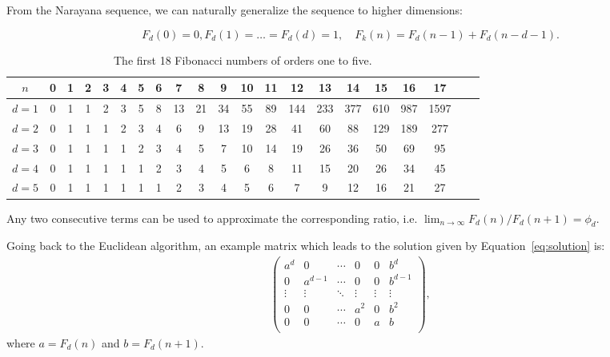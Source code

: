 \documentclass[english,version-2020-11]{uzl-thesis}
\begin{document}
From the Narayana sequence, we can naturally generalize the sequence to higher dimensions:

\[
  F_d(0) = 0, F_d(1) = \dots = F_d(d) = 1, \quad F_k(n) = F_d(n - 1) + F_d(n - d - 1).
\]

\begin{table}[t]
  \caption{The first 18 Fibonacci numbers of orders one to five.}
  \begin{tabular}{c|cccccccccccccccccccc}
    $n$     & 0 & 1 & 2 & 3 & 4 & 5 & 6 & 7  & 8  & 9  & 10 & 11 & 12  & 13  & 14  & 15  & 16  & 17   \\ %
    \hline
    $d = 1$ & 0 & 1 & 1 & 2 & 3 & 5 & 8 & 13 & 21 & 34 & 55 & 89 & 144 & 233 & 377 & 610 & 987 & 1597 \\ %
    $d = 2$ & 0 & 1 & 1 & 1 & 2 & 3 & 4 & 6  & 9  & 13 & 19 & 28 & 41  & 60  & 88  & 129 & 189 & 277  \\ %
    $d = 3$ & 0 & 1 & 1 & 1 & 1 & 2 & 3 & 4  & 5  & 7  & 10 & 14 & 19  & 26  & 36  & 50  & 69  & 95   \\ %
    $d = 4$ & 0 & 1 & 1 & 1 & 1 & 1 & 2 & 3  & 4  & 5  & 6  & 8  & 11  & 15  & 20  & 26  & 34  & 45   \\ %
    $d = 5$ & 0 & 1 & 1 & 1 & 1 & 1 & 1 & 2  & 3  & 4  & 5  & 6  & 7   & 9   & 12  & 16  & 21  & 27   \\ %
  \end{tabular}
\end{table}

Any two consecutive terms can be used to approximate the corresponding ratio, i.e. $\lim_{n \to \infty} F_d(n) / F_d(n + 1) = \phi_d$.

Going back to the Euclidean algorithm,
an example matrix which leads to the solution given by Equation~\ref{eq:solution} is:
\begin{align*}
  \left(\begin{array}{ccccc|c}
    a^d    & 0       & \cdots & 0      & 0      & b^d     \\
    0      & a^{d-1} & \cdots & 0      & 0      & b^{d-1} \\
    \vdots & \vdots  & \ddots & \vdots & \vdots & \vdots  \\
    0      & 0       & \cdots & a^2    & 0      & b^2     \\
    0      & 0       & \cdots & 0      & a      & b       \\
  \end{array}\right),
\end{align*}
where $a = F_d(n)$ and $b = F_d(n + 1)$.
\end{document}
